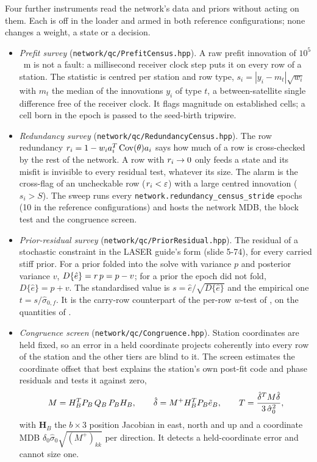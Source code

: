 \documentclass[main.tex]{subfiles}
\begin{document}
Four further instruments read the network's data and priors without acting on
them.  Each is off in the loader and armed in both reference configurations;
none changes a weight, a state or a decision.
\begin{itemize}[leftmargin=*, itemsep=2pt]
\item \emph{Prefit survey} (\texttt{network/qc/PrefitCensus.hpp}).  A raw
      prefit innovation of $10^5$~m is not a fault: a millisecond receiver
      clock step puts it on every row of a station.  The statistic is
      centred per station and row type,
      $s_i=|y_i-m_t|\sqrt{w_i}$ with $m_t$ the median of the innovations $y_i$ of
      type $t$, a between-satellite single difference free of the receiver
      clock.  It flags magnitude on established cells; a cell born in the
      epoch is passed to the seed-birth tripwire.
\item \emph{Redundancy survey} (\texttt{network/qc/RedundancyCensus.hpp}).  The
      row redundancy $r_i=1-w_ia_i^{T}\operatorname{Cov}(\theta)a_i$
      says how much of a row is cross-checked by the rest of the network.  A row
      with $r_i\to0$ only feeds a state and its misfit is invisible to every
      residual test, whatever its size.  The alarm is the cross-flag of an
      uncheckable row ($r_i<\varepsilon$) with a large centred innovation
      ($s_i>S$).  The sweep runs every \texttt{network.redundancy\_census\_stride}
      epochs (10 in the reference configurations) and hosts the network MDB, the
      block test and the congruence screen.
\item \emph{Prior-residual survey} (\texttt{network/qc/PriorResidual.hpp}).  The
      residual of a stochastic constraint in the LASER guide's form
      (slide 5-74), for every carried stiff prior.  For a prior folded into the
      solve with variance $p$ and posterior variance $v$,
      $D\{\hat e\}=r\,p=p-v$; for a prior the epoch did not fold,
      $D\{\hat e\}=p+v$.  The standardised value is
      $s=\hat e/\sqrt{D\{\hat e\}}$ and the empirical one
      $t=s/\hat\sigma_{0,f}$.  It is the carry-row counterpart of the per-row
      $w$-test of , on the quantities of
      .
\item \emph{Congruence screen} (\texttt{network/qc/Congruence.hpp}).  Station
      coordinates are held fixed, so an error in a held coordinate projects
      coherently into every row of the station and the other tiers are blind to it.
      The screen estimates the coordinate offset that best explains the station's
      own post-fit code and phase residuals and tests it against zero,
      \begin{equation}
      M=H_B^{T}P_B\,Q_B\,P_BH_B,\qquad
      \hat{\delta}=M^{+}H_B^{T}P_B\tilde{e}_B,\qquad
      T=\frac{\hat{\delta}^{T}M\hat{\delta}}{3\,\hat\sigma_0^2},
      \end{equation}
      with $\bm H_B$ the $b\times3$ position Jacobian in east, north and up and a
      coordinate MDB $\delta_0\hat\sigma_0\sqrt{(M^{+})_{kk}}$ per direction.  It
      detects a held-coordinate error and cannot size one.
\end{itemize}
\end{document}
